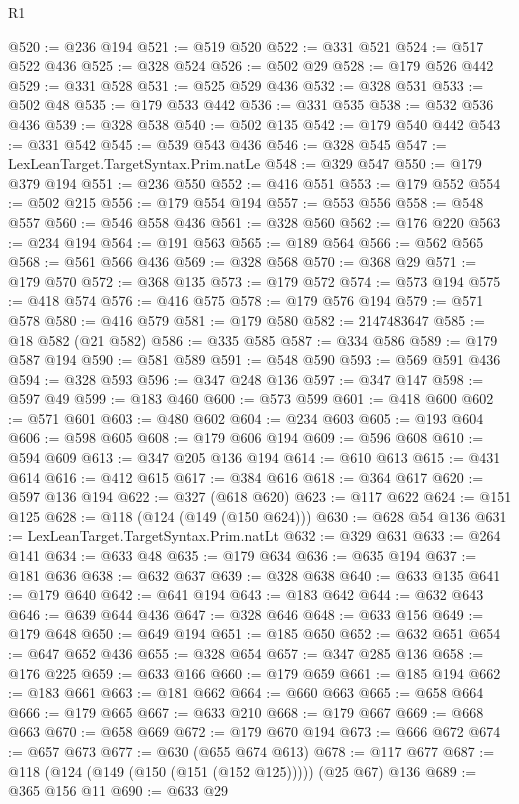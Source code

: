 \begin{lexlean}{R1}
\begin{coremodule}
@520 := @236 @194
@521 := @519 @520
@522 := @331 @521
@524 := @517 @522 @436
@525 := @328 @524
@526 := @502 @29
@528 := @179 @526 @442
@529 := @331 @528
@531 := @525 @529 @436
@532 := @328 @531
@533 := @502 @48
@535 := @179 @533 @442
@536 := @331 @535
@538 := @532 @536 @436
@539 := @328 @538
@540 := @502 @135
@542 := @179 @540 @442
@543 := @331 @542
@545 := @539 @543 @436
@546 := @328 @545
@547 := LexLeanTarget.TargetSyntax.Prim.natLe
@548 := @329 @547
@550 := @179 @379 @194
@551 := @236 @550
@552 := @416 @551
@553 := @179 @552
@554 := @502 @215
@556 := @179 @554 @194
@557 := @553 @556
@558 := @548 @557
@560 := @546 @558 @436
@561 := @328 @560
@562 := @176 @220
@563 := @234 @194
@564 := @191 @563
@565 := @189 @564
@566 := @562 @565
@568 := @561 @566 @436
@569 := @328 @568
@570 := @368 @29
@571 := @179 @570
@572 := @368 @135
@573 := @179 @572
@574 := @573 @194
@575 := @418 @574
@576 := @416 @575
@578 := @179 @576 @194
@579 := @571 @578
@580 := @416 @579
@581 := @179 @580
@582 := 2147483647
@585 := @18 @582 (@21 @582)
@586 := @335 @585
@587 := @334 @586
@589 := @179 @587 @194
@590 := @581 @589
@591 := @548 @590
@593 := @569 @591 @436
@594 := @328 @593
@596 := @347 @248 @136
@597 := @347 @147
@598 := @597 @49
@599 := @183 @460
@600 := @573 @599
@601 := @418 @600
@602 := @571 @601
@603 := @480 @602
@604 := @234 @603
@605 := @193 @604
@606 := @598 @605
@608 := @179 @606 @194
@609 := @596 @608
@610 := @594 @609
@613 := @347 @205 @136 @194
@614 := @610 @613
@615 := @431 @614
@616 := @412 @615
@617 := @384 @616
@618 := @364 @617
@620 := @597 @136 @194
@622 := @327 (@618 @620)
@623 := @117 @622
@624 := @151 @125
@628 := @118 (@124 (@149 (@150 @624)))
@630 := @628 @54 @136
@631 := LexLeanTarget.TargetSyntax.Prim.natLt
@632 := @329 @631
@633 := @264 @141
@634 := @633 @48
@635 := @179 @634
@636 := @635 @194
@637 := @181 @636
@638 := @632 @637
@639 := @328 @638
@640 := @633 @135
@641 := @179 @640
@642 := @641 @194
@643 := @183 @642
@644 := @632 @643
@646 := @639 @644 @436
@647 := @328 @646
@648 := @633 @156
@649 := @179 @648
@650 := @649 @194
@651 := @185 @650
@652 := @632 @651
@654 := @647 @652 @436
@655 := @328 @654
@657 := @347 @285 @136
@658 := @176 @225
@659 := @633 @166
@660 := @179 @659
@661 := @185 @194
@662 := @183 @661
@663 := @181 @662
@664 := @660 @663
@665 := @658 @664
@666 := @179 @665
@667 := @633 @210
@668 := @179 @667
@669 := @668 @663
@670 := @658 @669
@672 := @179 @670 @194
@673 := @666 @672
@674 := @657 @673
@677 := @630 (@655 @674 @613)
@678 := @117 @677
@687 := @118 (@124 (@149 (@150 (@151 (@152 @125))))) (@25 @67) @136
@689 := @365 @156 @11
@690 := @633 @29

\end{coremodule}
\end{lexlean}
